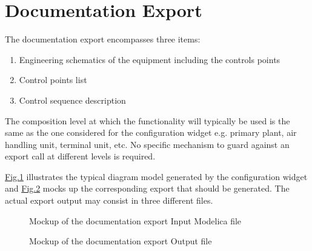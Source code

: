 \documentclass[letterpaper,10pt, openany,english]{sphinxmanual}
\begin{document}
\section{Documentation Export}
\label{\detokenize{requirements:documentation-export}}\label{\detokenize{requirements:sec-documentation-export}}
The documentation export encompasses three items:
\begin{enumerate}
%
\item {} 
Engineering schematics of the equipment including the controls points

\item {} 
Control points list

\item {} 
Control sequence description

\end{enumerate}

The composition level at which the functionality will typically be used is the same as the one considered for the configuration widget e.g. primary plant, air handling unit, terminal unit, etc. No specific mechanism to guard against an export call at different levels is required.

\hyperref[\detokenize{requirements:screen-schematics-modelica}]{Fig.\@ \ref{\detokenize{requirements:screen-schematics-modelica}}} illustrates the typical diagram model generated by the configuration widget and \hyperref[\detokenize{requirements:screen-schematics-output}]{Fig.\@ \ref{\detokenize{requirements:screen-schematics-output}}} mocks up the corresponding export that should be generated. The actual export output may consist in three different files.

\begin{figure}[htbp]
\centering
\capstart

\noindent{}
\caption{Mockup of the documentation export \textendash{} Input Modelica file}\label{\detokenize{requirements:screen-schematics-modelica}}\end{figure}

\begin{figure}[htbp]
\centering
\capstart

\noindent{}
\caption{Mockup of the documentation export \textendash{} Output file}\label{\detokenize{requirements:screen-schematics-output}}\end{figure}
\end{document}
